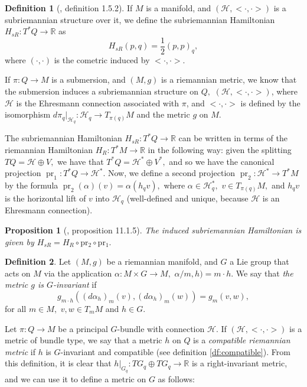 \documentclass[12pt, letterpaper, reqno]{amsart}
\theoremstyle{definition}
\newtheorem{df}{Definition}
\theoremstyle{plain}
\newtheorem{prop}{Proposition}
\theoremstyle{remark}
\begin{document}
\begin{df}[\cite{montgomery2002tour}, definition 1.5.2]
	If $ M $ is a manifold, and $ \left( \mathcal{H}, <\cdot,\cdot> \right) $ is a subriemannian structure over it, we define the subriemannian Hamiltonian $ H_{sR}: T^*Q \rightarrow \mathbb{R} $ as $$ H_{sR}(p,q)= \frac{1}{2} (p,p)_q, $$   	
	where $ (\cdot,\cdot) $ is the cometric induced by $ <\cdot,\cdot>. $ 
\end{df}
If $ \pi: Q \rightarrow M $ is a submersion, and $ (M,g) $ is a riemannian metric, we know that the submersion induces a subriemannian structure on $ Q, $ $ (\mathcal{H},<\cdot,\cdot>) $, where $ \mathcal{H} $ is the Ehresmann connection associated with $ \pi $, and $ <\cdot,\cdot> $ is defined by the isomorphism $ d\pi_q|_{\mathcal{H}_q}: \mathcal{H}_q \rightarrow T_{\pi(q)}M $ and the metric $ g $ on $ M. $ 

The subriemannian Hamiltonian $ H_{sR}: T^*Q \rightarrow \mathbb{R}$ can be written in terms of the riemannian Hamiltonian $ H_R: T^*M \rightarrow \mathbb{R} $ in the following way: given the splitting $ TQ= \mathcal{H}\oplus V, $ we have that $ T^*Q = \mathcal{H}^* \oplus V^*, $ and so we have the canonical projection $ \operatorname{pr}_1: T^*Q \rightarrow \mathcal{H}^*. $ Now, we define a second projection $ \operatorname{pr}_2: \mathcal{H}^* \rightarrow T^*M $ by the formula $ \operatorname{pr}_2(\alpha)(v)=\alpha(h_q v), $ where $ \alpha\in \mathcal{H}^*_q, $ $ v\in T_{\pi(q)}M, $ and $h_qv$ is the horizontal lift of $ v $ into $ \mathcal{H}_q $ (well-defined and unique, because $ \mathcal{H} $ is an Ehresmann connection).
\begin{prop}[\cite{montgomery2002tour}, proposition 11.1.5]
	The induced subriemannian Hamiltonian is given by $H_{sR}= H_R \circ \operatorname{pr_2}\circ \operatorname{pr_1}. $ 
\end{prop}

\begin{df}
	Let $ (M,g) $ be a riemannian manifold, and $G $ a Lie group that acts on $ M $ via the application $ \alpha: M\times G \rightarrow M, $ $ \alpha/m,h)= m\cdot h. $ We say that \textit{the metric $ g $ is $ G $-invariant} if  
	$$ g_{m\cdot h}((d\alpha_h)_m(v),(d\alpha_h)_m(w))=g_m(v,w), $$ 
	for all $ m\in M, $ $ v,w\in T_mM $ and $ h\in G. $ 
\end{df}

Let $ \pi: Q \rightarrow M $ be a principal $ G $-bundle with connection $ \mathcal{H}. $ If $ (\mathcal{H},<\cdot,\cdot>) $ is a metric of bundle type, we say that a metric $ h $ on $ Q $ is a \textit{compatible riemannian metric} if $ h $ is $ G $-invariant and compatible (see definition \ref{df:compatible}). From this definition, it is clear that $ h|_{G_q}: TG_q \oplus TG_q \rightarrow \mathbb{R} $ is a right-invariant metric, and we can use it to define a metric on $ G $ as follows:
\end{document}
